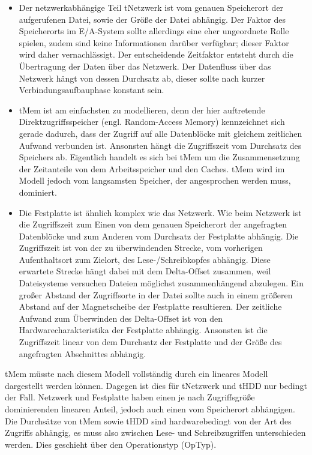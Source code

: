\documentclass[
	twoside,
	12pt,
	a4paper,
	BCOR10mm,
	DIV14,
	listof=totoc,
	bibliography=totoc,
	headsepline
]{scrreprt}
\begin{document}
\begin{itemize}
	\item Der netzwerkabhängige Teil tNetzwerk ist vom genauen Speicherort der aufgerufenen Datei, sowie der Größe der Datei abhängig. Der Faktor des Speicherorts im E/A-System sollte allerdings eine eher ungeordnete Rolle spielen, zudem sind keine Informationen darüber verfügbar; dieser Faktor wird daher vernachlässigt. 
	Der entscheidende Zeitfaktor entsteht durch die Übertragung der Daten über das Netzwerk. Der Datenfluss über das Netzwerk hängt von dessen Durchsatz ab, dieser sollte nach kurzer Verbindungsaufbauphase konstant sein.
	\item tMem ist am einfachsten zu modellieren, denn der hier auftretende Direktzugriffsspeicher (engl. Random-Access Memory) kennzeichnet sich gerade dadurch, dass der Zugriff auf alle Datenblöcke mit gleichem zeitlichen Aufwand verbunden ist.
	Ansonsten hängt die Zugriffszeit vom Durchsatz des Speichers ab.
	Eigentlich handelt es sich bei tMem um die Zusammensetzung der Zeitanteile von dem Arbeitsspeicher und den Caches. tMem wird im Modell jedoch vom langsamsten Speicher, der angesprochen werden muss, dominiert.
	\item Die Festplatte ist ähnlich komplex wie das Netzwerk. Wie beim Netzwerk ist die Zugriffszeit zum Einen von dem genauen Speicherort der angefragten Datenblöcke und zum Anderen vom Durchsatz der Festplatte abhängig.
	Die Zugriffszeit ist von der zu überwindenden Strecke, vom vorherigen Aufenthaltsort zum Zielort, des Lese-/Schreibkopfes abhängig.
	Diese erwartete Strecke hängt dabei mit dem $\mbox{Delta-Offset}$ zusammen, weil Dateisysteme versuchen Dateien möglichst zusammenhängend abzulegen.
	Ein großer Abstand der Zugriffsorte in der Datei sollte auch in einem größeren Abstand auf der Magnetscheibe der Festplatte resultieren.
	Der zeitliche Aufwand zum Überwinden des $\mbox{Delta-Offset}$ ist von den Hardwarecharakteristika der Festplatte abhängig. Ansonsten ist die Zugriffszeit linear von dem Durchsatz der Festplatte und der Größe des angefragten Abschnittes abhängig.
\end{itemize}

tMem müsste nach diesem Modell vollständig durch ein lineares Modell dargestellt werden können. Dagegen ist dies für tNetzwerk und tHDD nur bedingt der Fall.
Netzwerk und Festplatte haben einen je nach Zugriffsgröße dominierenden linearen Anteil, jedoch auch einen vom Speicherort abhängigen.
Die Durchsätze von tMem sowie tHDD sind hardwarebedingt von der Art des Zugriffs abhängig, es muss also zwischen Lese- und Schreibzugriffen unterschieden werden.
Dies geschieht über den Operationstyp (OpTyp).
\end{document}
